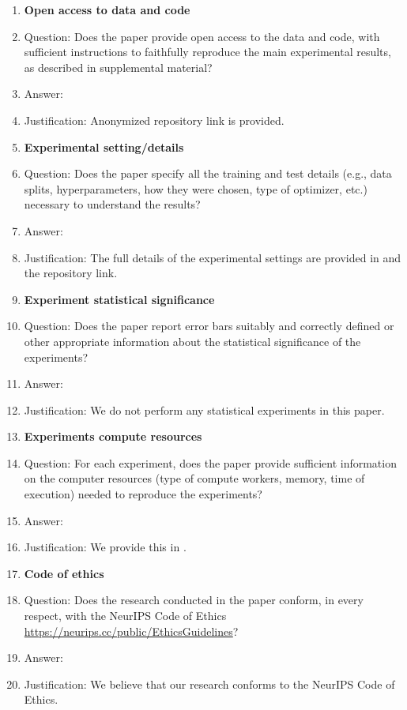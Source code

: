 \documentclass{article}
\begin{document}
\begin{enumerate}
\item {\bf Open access to data and code}
    \item[] Question: Does the paper provide open access to the data and code, with sufficient instructions to faithfully reproduce the main experimental results, as described in supplemental material?
    \item[] Answer: \answerYes{} %
    \item[] Justification: Anonymized repository link is provided.

\item {\bf Experimental setting/details}
    \item[] Question: Does the paper specify all the training and test details (e.g., data splits, hyperparameters, how they were chosen, type of optimizer, etc.) necessary to understand the results?
    \item[] Answer: \answerYes{} %
    \item[] Justification: The full details of the experimental settings are provided in  and the repository link.

\item {\bf Experiment statistical significance}
    \item[] Question: Does the paper report error bars suitably and correctly defined or other appropriate information about the statistical significance of the experiments?
    \item[] Answer: \answerNA{} %
    \item[] Justification: We do not perform any statistical experiments in this paper.

\item {\bf Experiments compute resources}
    \item[] Question: For each experiment, does the paper provide sufficient information on the computer resources (type of compute workers, memory, time of execution) needed to reproduce the experiments?
    \item[] Answer: \answerYes{} %
    \item[] Justification: We provide this in .

\item {\bf Code of ethics}
    \item[] Question: Does the research conducted in the paper conform, in every respect, with the NeurIPS Code of Ethics \url{https://neurips.cc/public/EthicsGuidelines}?
    \item[] Answer: \answerYes{} %
    \item[] Justification: We believe that our research conforms to the NeurIPS Code of Ethics.



\end{enumerate}
\end{document}
